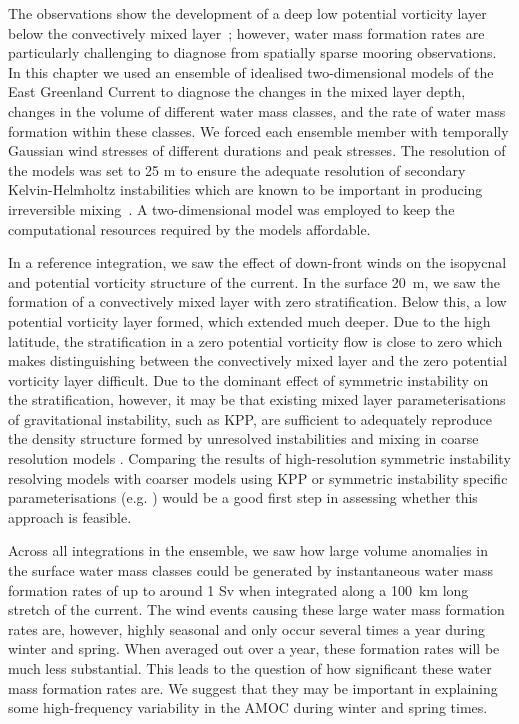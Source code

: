 The observations show the development of a deep low potential vorticity layer below the convectively mixed layer~\citep{LeBras2022}; however, water mass formation rates are particularly challenging to diagnose from spatially sparse mooring observations. In this chapter we used an ensemble of idealised two-dimensional models of the East Greenland Current to diagnose the changes in the mixed layer depth, changes in the volume of different water mass classes, and the rate of water mass formation within these classes. We forced each ensemble member with temporally Gaussian wind stresses of different durations and peak stresses. The resolution of the models was set to 25 m to ensure the adequate resolution of secondary Kelvin-Helmholtz instabilities which are known to be important in producing irreversible mixing~\citep{Yankovsky2019, Griffiths2003a}. A two-dimensional model was employed to keep the computational resources required by the models affordable\footnotemark.

In a reference integration, we saw the effect of down-front winds on the isopycnal and potential vorticity structure of the current. In the surface 20~m, we saw the formation of a convectively mixed layer with zero stratification. Below this, a low potential vorticity layer formed, which extended much deeper. Due to the high latitude, the stratification in a zero potential vorticity flow is close to zero which makes distinguishing between the convectively mixed layer and the zero potential vorticity layer difficult. Due to the dominant effect of symmetric instability on the stratification, however, it may be that existing mixed layer parameterisations of gravitational instability, such as KPP, are sufficient to adequately reproduce the density structure formed by unresolved instabilities and mixing in coarse resolution models \citep{Large1994}. Comparing the results of high-resolution symmetric instability resolving models with coarser models using KPP or symmetric instability specific parameterisations (e.g. \citet{Bachman2017, Yankovsky2021}) would be a good first step in assessing whether this approach is feasible.

Across all integrations in the ensemble, we saw how large volume anomalies in the surface water mass classes could be generated by instantaneous water mass formation rates of up to around 1 Sv when integrated along a 100~km long stretch of the current. The wind events causing these large water mass formation rates are, however, highly seasonal and only occur several times a year during winter and spring. When averaged out over a year, these formation rates will be much less substantial. This leads to the question of how significant these water mass formation rates are. We suggest that they may be important in explaining some high-frequency variability in the AMOC during winter and spring times.

